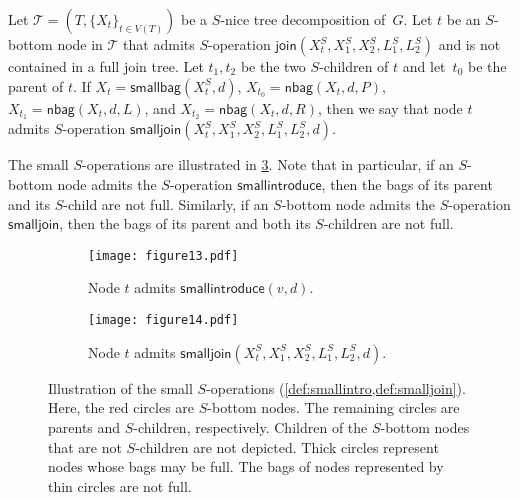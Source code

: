 \documentclass[a4paper,UKenglish,cleveref, autoref, thm-restate, numberwithinsect]{lipics-v2021}
\newcommand{\join}{\mathsf{join}}
\newcommand{\smallintroduce}{\mathsf{smallintroduce}}
\newcommand{\smalljoin}{\mathsf{smalljoin}}
\newcommand{\nbag}{\mathsf{nbag}}
\newcommand{\smallbag}{\mathsf{smallbag}}
\newcommand{\slim}{\text{slim}\xspace}
\begin{document}
\begin{definition}[$\smalljoin$]\label{def:smalljoin}
    Let $\mathcal{T}=(T,\{X_t\}_{t\in V(T)})$ be a \slim $S$-nice tree decomposition of~$G$. Let $t$ be an $S$-bottom node in $\mathcal{T}$ that admits $S$-operation $\join(X_t^S,X_1^S,X_2^S,L_{1}^S, L_{2}^S)$ and is not contained in a full join tree. Let $t_1,t_2$ be the two $S$-children of $t$ and let~$t_0$ be the parent of $t$. If $X_t=\smallbag(X^S_t,d)$, $X_{t_0}=\nbag(X_t,d,P)$, $X_{t_1}=\nbag(X_t,d,L)$, and $X_{t_2}=\nbag(X_t,d,R)$, then we say that node $t$ admits $S$-operation $\smalljoin(X^S_t,X_1^S,X_2^S,L_{1}^S, L_{2}^S,d)$.
\end{definition}

The small $S$-operations are illustrated in \cref{fig:smallops}. Note that in particular, if an $S$-bottom node admits the $S$-operation $\smallintroduce$, then the bags of its parent and its $S$-child are not full. Similarly, if an $S$-bottom node admits the $S$-operation $\smalljoin$, then the bags of its parent and both its $S$-children are not full. 


\begin{figure}[t]
\centering
\begin{subfigure}[t]{0.45\textwidth}
\centering
\texttt{[image: figure13.pdf]}
\caption{Node $t$ admits $\smallintroduce(v,d)$.}\label{fig:smallopsa}
\end{subfigure}
\begin{subfigure}[t]{0.49\textwidth}
\centering
\texttt{[image: figure14.pdf]}
\caption{Node $t$ admits $\smalljoin(X^S_t,X_1^S,X_2^S,L_{1}^S, L_{2}^S,d)$.}\label{fig:smallopsd}
\end{subfigure}
\caption{Illustration of the small $S$-operations (\cref{def:smallintro,def:smalljoin}). Here, the red circles are $S$-bottom nodes. The remaining circles are parents and $S$-children, respectively. Children of the $S$-bottom nodes that are not $S$-children are not depicted. Thick circles represent nodes whose bags may be full. The bags of nodes represented by thin circles are not full. 
}\label{fig:smallops}
\end{figure}
\end{document}
